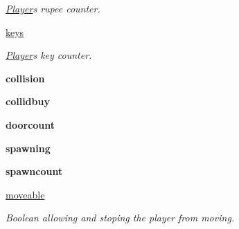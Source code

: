 \begin{DoxyCompactItemize}
\begin{DoxyCompactList}\small\item\em \hyperlink{classactor_1_1player_1_1_player}{Player}\textquotesingle{}s rupee counter. \end{DoxyCompactList}\item 
\mbox{\label{classactor_1_1player_1_1_player_a2be3c96f039bbc8e535f2bc2a9379b75}} 
\hyperlink{classactor_1_1player_1_1_player_a2be3c96f039bbc8e535f2bc2a9379b75}{keys}
\begin{DoxyCompactList}\small\item\em \hyperlink{classactor_1_1player_1_1_player}{Player}\textquotesingle{}s key counter. \end{DoxyCompactList}\item 
\mbox{\label{classactor_1_1player_1_1_player_a2d44111bc500754466a7cc60f560a3b1}} 
{\bfseries collision}
\item 
\mbox{\label{classactor_1_1player_1_1_player_ae7fd956a4af73cb7079ebac7fd02c500}} 
{\bfseries collidbuy}
\item 
\mbox{\label{classactor_1_1player_1_1_player_ad9f2b3abde9b91875f4840fed4f64da2}} 
{\bfseries doorcount}
\item 
\mbox{\label{classactor_1_1player_1_1_player_ab086494231fe0db5a191209fb496aa32}} 
{\bfseries spawning}
\item 
\mbox{\label{classactor_1_1player_1_1_player_acf96b0094e3294d7c0d0dcc23a2450e2}} 
{\bfseries spawncount}
\item 
\mbox{\label{classactor_1_1player_1_1_player_a62a06e2de507cf924ceb42c478e0acb9}} 
\hyperlink{classactor_1_1player_1_1_player_a62a06e2de507cf924ceb42c478e0acb9}{moveable}
\begin{DoxyCompactList}\small\item\em Boolean allowing and stoping the player from moving. \end{DoxyCompactList}\item 
\mbox{\label{classactor_1_1player_1_1_player_a77d57d979bab2c2918501b536130cd4f}} 

\end{DoxyCompactItemize}
